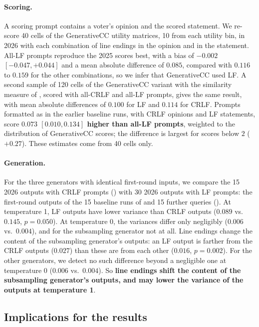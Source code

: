 \documentclass[letterpaper]{article} %
\begin{document}
\paragraph{Scoring.}
A scoring prompt contains a voter's opinion and the scored statement.
We re-score 40 cells of the GenerativeCC utility matrices, 10 from each utility bin, in 2026 with each combination of line endings in the opinion and in the statement.
All-LF prompts reproduce the 2025 scores best, with a bias of \(-0.002\) \([-0.047, +0.044]\) and a mean absolute difference of \(0.085\), compared with \(0.116\) to \(0.159\) for the other combinations, so we infer that GenerativeCC used LF.
A second sample of 120 cells of the GenerativeCC variant with the similarity measure of \citet{fish-v2}, scored with all-CRLF and all-LF prompts, gives the same result, with mean absolute differences of \(0.100\) for LF and \(0.114\) for CRLF.
Prompts formatted as in the earlier baseline runs, with CRLF opinions and LF statements, score \textbf{\(0.073\) \([0.010, 0.134]\) higher than all-LF prompts}, weighted to the distribution of GenerativeCC scores; the difference is largest for scores below \(2\) (\(+0.27\)).
These estimates come from 40 cells only.

\paragraph{Generation.}
For the three generators with identical first-round inputs, we compare the 15 2026 outputs with CRLF prompts () with 30 2026 outputs with LF prompts: the first-round outputs of the 15 baseline runs of  and 15 further queries ().
At temperature 1, LF outputs have lower variance than CRLF outputs (\(0.089\) vs.\ \(0.145\), \(p = 0.050\)).
At temperature 0, the variances differ only negligibly (\(0.006\) vs.\ \(0.004\)), and for the subsampling generator not at all.
Line endings change the content of the subsampling generator's outputs: an LF output is farther from the CRLF outputs (\(0.027\)) than these are from each other (\(0.016\), \(p = 0.002\)).
For the other generators, we detect no such difference beyond a negligible one at temperature 0 (\(0.006\) vs.\ \(0.004\)).
So \textbf{line endings shift the content of the subsampling generator's outputs, and may lower the variance of the outputs at temperature 1}.

\subsection{Implications for the results}
\end{document}
